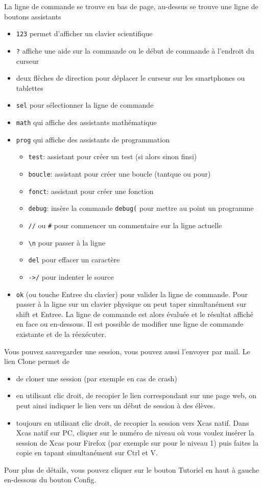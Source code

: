\documentclass[12pt,a4paper]{book}
\begin{document}
\begin{giacjshere}
La ligne de commande se trouve en bas de page, au-dessus se trouve
une ligne de boutons assistants
\begin{itemize}
\item \verb|123| permet d'afficher un clavier scientifique
\item \verb|?| affiche une aide sur la commande ou le d\'ebut de commande
\`a l'endroit du curseur
\item deux fl\`eches de direction pour d\'eplacer le curseur
sur les smartphones ou tablettes
\item \verb|sel| pour s\'electionner la ligne de commande
\item \verb|math| qui affiche des assistants math\'ematique
\item \verb|prog| qui affiche des assistants de programmation
\begin{itemize}
\item \verb|test|: assistant pour cr\'eer un test (si alors sinon finsi)
\item \verb|boucle|: assistant pour cr\'eer une boucle (tantque ou pour)
\item \verb|fonct|: assistant pour cr\'eer une fonction
\item \verb|debug|: ins\`ere la commande \verb|debug(| pour mettre
au point un programme
\item \verb|//| ou \verb|#| pour commencer un commentaire sur la ligne actuelle
\item \verb|\n| pour passer \`a la ligne
\item \verb|del| pour effacer un caract\`ere
\item \verb|->/| pour indenter le source
\end{itemize}
\item \verb|ok| (ou touche Entree du clavier) 
pour valider la ligne de commande.
Pour passer \`a la ligne sur un clavier physique 
on peut taper simultan\'ement sur shift et Entree.
La ligne de commande est alors \'evalu\'ee et le r\'esultat affich\'e
en face ou en-dessous. Il est possible de modifier une ligne de commande
existante et de la r\'eex\'ecuter.
\end{itemize}
Vous pouvez sauvegarder une session, vous pouvez aussi l'envoyer par mail.
Le lien Clone permet de 
\begin{itemize}
\item de cloner une session (par exemple en cas de crash)
\item en utilisant clic droit,
de recopier le lien correspondant sur une page web, on peut
ainsi indiquer le lien vers un d\'ebut de session \`a des \'el\`eves.
\item toujours en utilisant clic droit, de recopier la session
vers Xcas natif. Dans Xcas natif sur PC, cliquer sur le num\'ero
de niveau o\`u vous voulez ins\'erer la session de Xcas pour Firefox
(par exemple sur  pour le niveau 1)
puis faites la copie en tapant simultan\'ement sur Ctrl et V.
\end{itemize}
Pour plus de d\'etails, vous pouvez cliquer sur le bouton Tutoriel en
haut \`a gauche en-dessous du bouton Config.


\end{giacjshere}
\end{document}

